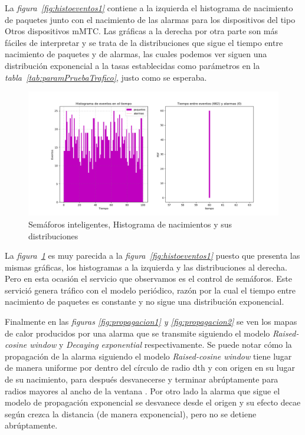 La \textit{figura~\ref{fig:histoeventos1}} contiene a la izquierda el histograma de  nacimiento de paquetes junto con el nacimiento de las alarmas para los dispositivos  del tipo Otros dispositivos mMTC. Las gráficas a la derecha por otra parte son más fáciles de interpretar y se trata de la distribuciones que sigue el tiempo entre nacimiento de paquetes y de alarmas, las cuales podemos ver  siguen una distribución exponencial a la tasas establecidas como parámetros en la  \textit{tabla~\ref{tab:paramPruebaTrafico}}, justo como se esperaba.\newline

\begin{figure}[th]
    \centering
    \includegraphics[scale=.55]{Figures/Semaforos_inteligentes.png}
    \decoRule
    \caption[Semáforos inteligentes, Histograma de nacimientos y sus distribuciones]{Semáforos inteligentes, Histograma de nacimientos y sus distribuciones}
    \label{fig:histoeventos2}
\end{figure}

La \textit{figura~\ref{fig:histoeventos2}} es muy parecida a la \textit{figura~\ref{fig:histoeventos1}} puesto que presenta las mismas gráficas, los histogramas a la izquierda y las distribuciones al derecha.  Pero en esta ocasión el servicio que observamos es el control de semáforos. Este servició genera  tráfico con el modelo periódico, razón por la cual el tiempo entre nacimiento de paquetes  es constante y no sigue una distribución exponencial.\newline

Finalmente en las \textit{figuras \ref{fig:propagacion1} y \ref{fig:propagacion2}} se ven los mapas de calor producidos por una alarma que se transmite siguiendo el modelo \textit{Raised-cosine window} y \textit{Decaying exponential} respectivamente. Se puede notar cómo la propagación de la alarma siguiendo el modelo \textit{Raised-cosine window} tiene lugar de manera uniforme por dentro del círculo de radio dth  y con origen en su lugar de su nacimiento, para después desvanecerse y terminar abrúptamente para radios mayores al ancho de la ventana . Por otro lado la alarma que sigue el modelo de propagación exponencial se desvanece desde el origen y su efecto decae según crezca la distancia (de manera exponencial), pero no se detiene abrúptamente.\newline

